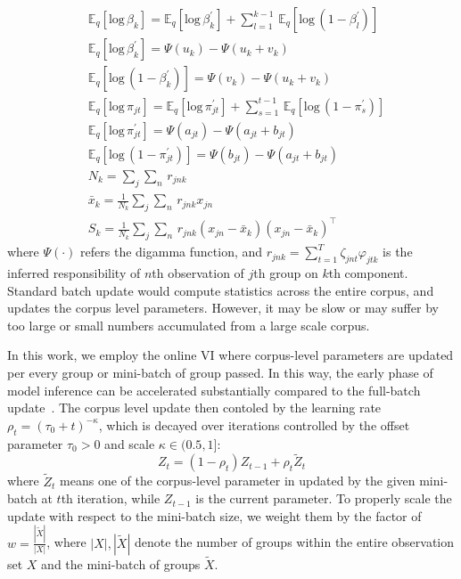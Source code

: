 \documentclass{article}
\begin{document}
\begin{align}\label{eq:expectations_and_suffstats}
    &\mathbb{E}_{q}[\text{log}\,\beta_{k}] = \mathbb{E}_{q}[\text{log}\,\beta_{k}^{\prime}] + \textstyle\sum_{l=1}^{k-1}\,\mathbb{E}_{q}[\text{log}\,(1 - \beta_{l}^{\prime})] \nonumber\\
    &\mathbb{E}_{q}[\text{log}\,\beta_{k}^{\prime}] = \Psi(u_{k}) - \Psi(u_{k} + v_{k}) \nonumber\\
    &\mathbb{E}_{q}[\text{log}\,(1 - \beta_{k}^{\prime})] = \Psi(v_{k}) - \Psi(u_{k} + v_{k}) \nonumber\\
    &\mathbb{E}_{q}[\text{log}\,\pi_{jt}] = \mathbb{E}_{q}[\text{log}\,\pi_{jt}^{\prime}] + \textstyle\sum_{s=1}^{t-1}\,\mathbb{E}_{q}[\text{log}\,(1 - \pi_{s}^{\prime})] \nonumber\\
    &\mathbb{E}_{q}[\text{log}\,\pi_{jt}^{\prime}] = \Psi(a_{jt}) - \Psi(a_{jt} + b_{jt}) \nonumber\\
    &\mathbb{E}_{q}[\text{log}\,(1 - \pi_{jt}^{\prime})] = \Psi(b_{jt}) - \Psi(a_{jt} + b_{jt}) \nonumber\\
    &N_{k} = \textstyle\sum_{j}\sum_{n}\,r_{jnk} \nonumber\\
    &\bar{x}_{k} = \frac{1}{N_{k}}\textstyle\sum_{j}\sum_{n}\,r_{jnk}x_{jn} \nonumber\\
    &S_{k} = \frac{1}{N_{k}}\textstyle\sum_{j}\sum_{n}\,r_{jnk}(x_{jn} - \bar{x}_{k})(x_{jn} - \bar{x}_{k})^{\intercal} \nonumber
\end{align}
where $\Psi(\cdot)$ refers the digamma function, and $r_{jnk} = \sum_{t=1}^{T} \zeta_{jnt}\varphi_{jtk}$ is the inferred responsibility of $n$th observation of $j$th group on $k$th component. Standard batch update would compute statistics across the entire corpus, and updates the corpus level parameters. However, it may be slow or may suffer by too large or small numbers accumulated from a large scale corpus.

In this work, we employ the online VI where corpus-level parameters are updated per every group or mini-batch of group passed. In this way, the early phase of model inference can be accelerated substantially compared to the full-batch update~\cite{DBLP:journals/jmlr/WangPB11, DBLP:conf/nips/HoffmanBB10}. The corpus level update then contoled by the learning rate $\rho_{t} = (\tau_{0} + t)^{-\kappa}$, which is decayed over iterations controlled by the offset parameter $\tau_{0} > 0$ and scale $\kappa \in (0.5, 1]$:
\begin{equation}\label{eq:minibatch_update}
    Z_{t} = (1 - \rho_{t})Z_{t - 1} + \rho_{t}\tilde{Z}_{t}
\end{equation}
where $\tilde{Z}_{t}$ means one of the corpus-level parameter in  updated by the given mini-batch at $t$th iteration, while $Z_{t-1}$ is the current parameter. To properly scale the update with respect to the mini-batch size, we weight them by the factor of $w = \frac{|\tilde{X}|}{|X|}$, where $|X|, |\tilde{X}|$ denote the number of groups within the entire observation set $X$ and the mini-batch of groups $\tilde{X}$.
\end{document}
